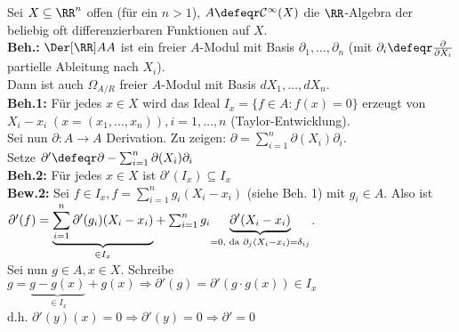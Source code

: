 \begin{nnBsp}
  Sei $X \subseteq \RR^n$ offen (für ein $n>1$), $A \defeqr
  \mathcal{C}^{\infty}(X)$ die $\RR$-Algebra der beliebig oft
  differenzierbaren Funktionen auf $X$.\\
  \textbf{Beh.:} $\Der[{\RR}]{A}{A}$ ist ein freier $A$-Modul mit
  Basis $\partial_1, \dots , \partial_n$ (mit $\partial_i \defeqr 
  \frac{\partial}{\partial X_i}$ partielle Ableitung nach $X_i$).\\
  Dann ist auch $\Omega_{A/R}$ freier $A$-Modul mit Basis $d X_1, \dots , d
  X_n$.\\
  \textbf{Beh.1:} Für jedes $x \in X$ wird das Ideal $I_x = \{ f \in A: f(x) = 0
  \}$ erzeugt von $X_i - x_i \; (x = (x_1, \dots , x_n)), i = 1 , \dots , n$
  (Taylor-Entwicklung).\\
  Sei nun $\partial: A \to A$ Derivation. Zu zeigen: $\partial = \sum_{i = 1}^n
  \partial(X_i) \partial_i$.\\
  Setze $\partial' \defeqr \partial - \sum_{i = 1}^n \partial(X_i) \partial_i$\\
  \textbf{Beh.2:} Für jedes $x \in X$ ist $\partial'(I_x) \subseteq I_x$\\
  \textbf{Bew.2:} Sei $f \in I_x, f = \sum_{i = 1}^n g_i (X_i - x_i)$ (siehe
  Beh. 1) mit $g_i \in A$. Also ist $\partial'(f) = \underset{\in
  I_x}{\underbrace{\sum_{i = 1}^n
  \partial'(g_i)(X_i - x_i)}} + \sum_{i = 1}^n g_i \underset{\scriptsize=0,
  \text{ da } \partial_j(X_i-x_i)=\delta_{ij}}{\underbrace{\partial'(X_i -
  x_i)}}$.\\
  Sei nun $g \in A, x \in X$.
  Schreibe $g = \underset{\in I_x}{\underbrace{g - g(x)}} + g(x) \Rightarrow
  \partial'(g) = \partial'(g \cdot g(x)) \in I_x$\\
  d.h. $\partial'(y)(x) = 0 \Rightarrow \partial'(y) = 0 \Rightarrow \partial' =
  0$
\end{nnBsp}

